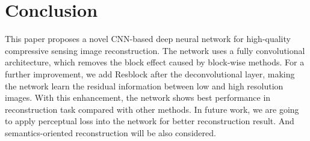 \documentclass[review]{elsarticle}
\begin{document}
\section{Conclusion}\label{Conclusion}\label{conclusion}
This paper proposes a novel CNN-based deep neural network for high-quality compressive sensing image reconstruction. The network uses a fully convolutional architecture, which removes the block effect caused by block-wise methods. For a further improvement, we add Resblock after the deconvolutional layer, making the network learn the residual information between low and high resolution images. With this enhancement, the network shows best performance in reconstruction task compared with other methods. In future work, we are going to apply perceptual loss into the network for better reconstruction result. And semantics-oriented reconstruction will be also considered.



\end{document}
